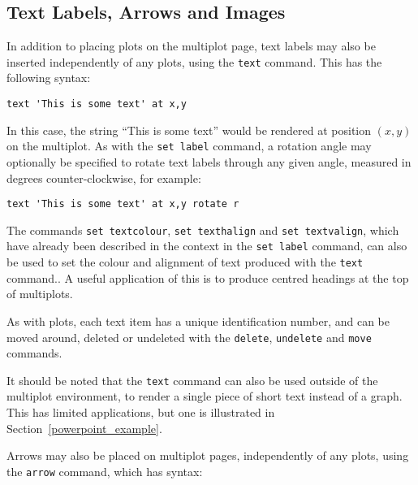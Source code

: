 \documentclass[a4paper,onecolumn,11pt]{book}
\begin{document}
\subsection{Text Labels, Arrows and Images}

\label{text_command} In addition to
placing plots on the multiplot page, text labels may also be inserted
independently of any plots, using the \texttt{text} command. This has the
following syntax:

\begin{verbatim} 
text 'This is some text' at x,y
\end{verbatim}

In this case, the string ``This is some text'' would be rendered at position
$(x,y)$ on the multiplot. As with the \texttt{set label} command, a rotation
angle may optionally be specified to rotate text labels through any given
angle, measured in degrees counter-clockwise, for example:

\begin{verbatim} 
text 'This is some text' at x,y rotate r
\end{verbatim}

The commands \texttt{set textcolour}, \texttt{set
texthalign} and \texttt{set textvalign}, which have already been described in
the context in the \texttt{set label} command, can also be used to set the
colour and alignment of text produced with the \texttt{text} command.. A useful application of this is to
produce centred headings at the top of multiplots.

As with plots, each text item has a unique identification number, and can be
moved around, deleted or undeleted with the \texttt{delete}, \texttt{undelete}
and \texttt{move} commands.

It should be noted that the \texttt{text} command can also be used outside of
the multiplot environment, to render a single piece of short text instead of a
graph. This has limited applications, but one is illustrated in
Section~\ref{powerpoint_example}.

\label{arrows}  Arrows may also be
placed on multiplot pages, independently of any plots, using the \texttt{arrow}
command, which has syntax:
\end{document}
